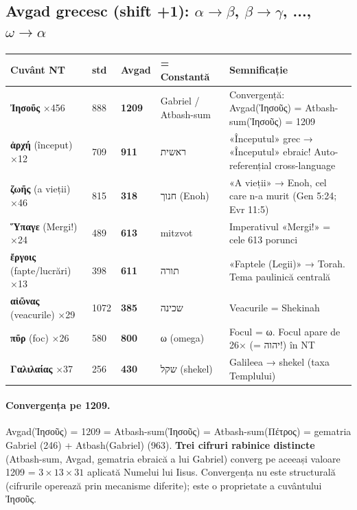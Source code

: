 \documentclass[12pt,a4paper,twoside,openany]{book}
\begin{document}
\subsection{Avgad grecesc (shift +1): $\alpha \to \beta$, $\beta \to \gamma$, ..., $\omega \to \alpha$}

\begin{center}
\footnotesize
\begin{tabular}{L{2.6cm}C{0.8cm}C{1cm}L{2.5cm}L{6.3cm}}
\toprule
{}
\textbf{Cuvânt NT} & \textbf{std} & \textbf{Avgad} & \textbf{= Constantă} & \textbf{Semnificație} \\
\midrule
\textbf{Ἰησοῦς} ×456 & 888 & \textbf{1209} & Gabriel / Atbash-sum & Convergență: Avgad(Ἰησοῦς) = Atbash-sum(Ἰησοῦς) = 1209 \\
\textbf{ἀρχή} (început) ×12 & 709 & \textbf{911} & ראשית & «Începutul» grec → «Începutul» ebraic! Auto-referențial cross-language \\
\textbf{ζωῆς} (a vieții) ×46 & 815 & \textbf{318} & חנוך (Enoh) & «A vieții» → Enoh, cel care n-a murit (Gen 5:24; Evr 11:5) \\
\textbf{Ὕπαγε} (Mergi!) ×24 & 489 & \textbf{613} & mitzvot & Imperativul «Mergi!» = cele 613 porunci \\
\textbf{ἔργοις} (fapte/lucrări) ×13 & 398 & \textbf{611} & תורה & «Faptele (Legii)» → Torah. Tema paulinică centrală \\
\textbf{αἰῶνας} (veacurile) ×29 & 1072 & \textbf{385} & שכינה & Veacurile = Shekinah \\
\textbf{πῦρ} (foc) ×26 & 580 & \textbf{800} & ω (omega) & Focul = ω. Focul apare de 26× (= יהוה!) în NT \\
\textbf{Γαλιλαίας} ×37 & 256 & \textbf{430} & שקל (shekel) & Galileea → shekel (taxa Templului) \\
\bottomrule
\end{tabular}
\end{center}

\paragraph*{Convergența pe 1209.} Avgad(Ἰησοῦς) = 1209 = Atbash-sum(Ἰησοῦς) = Atbash-sum(Πέτρος) = gematria Gabriel (246) + Atbash(Gabriel) (963). \textbf{Trei cifruri rabinice distincte} (Atbash-sum, Avgad, gematria ebraică a lui Gabriel) converg pe aceeași valoare 1209 = $3 \times 13 \times 31$ aplicată Numelui lui Iisus. Convergența nu este structurală (cifrurile operează prin mecanisme diferite); este o proprietate a cuvântului Ἰησοῦς.
\end{document}
